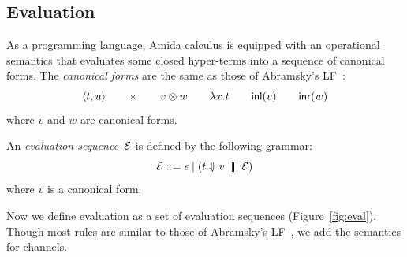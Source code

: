 \subsection{Evaluation}
As a programming language, Amida calculus is equipped with an
operational semantics that evaluates some closed hyper-terms into a sequence
of canonical forms.
The \textit{canonical forms} are the same as those of Abramsky's
LF~\citep{abramsky1993computational}:
\[
 \langle{t,u}\rangle\qquad \ast\qquad v\otimes w\qquad \lambda
 x.t\qquad \mathsf{inl}({v})\qquad\mathsf{inr}({w})
\]
where $v$ and $w$ are canonical forms.

An \textit{evaluation
sequence}~$\mathcal{E}$ is defined by the following
grammar:
\[
 \hypere ::= \epsilon\mid (t\eval v\hmid \hypere)
\]
where $v$ is a canonical form.

Now we define evaluation as a set of evaluation sequences
(Figure~\ref{fig:eval}).
Though most rules are similar to those of Abramsky's
LF~\citep{abramsky1993computational},
we add the semantics for channels.

